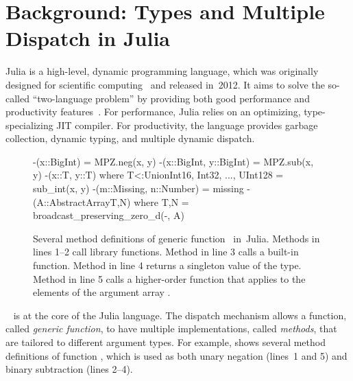 \chapter{Background: Types and Multiple Dispatch in Julia}%
\label{chap:background}


Julia is a high-level, dynamic programming language, which was originally
designed for scientific computing~\cite{bib:bezanson:julia-fresh:2017}
and released in~2012.
It aims to solve the so-called ``two-language problem''
by providing both good performance and productivity
features~\cite{bib:bezanson:julia-dyn-perf:oopsla:2018}.
For performance, Julia relies on an optimizing, type-specializing JIT compiler.
For productivity, the language provides garbage collection, dynamic typing, and
multiple dynamic dispatch.

\begin{figure}[t]
\begin{julia}
-(x::BigInt) = MPZ.neg(x, y)
-(x::BigInt, y::BigInt) = MPZ.sub(x, y)
-(x::T, y::T) where T<:Union{Int16, Int32, ..., UInt128} = sub_int(x, y)
-(m::Missing, n::Number) = missing
-(A::AbstractArray{T,N}) where {T,N} = broadcast_preserving_zero_d(-, A)
\end{julia}
\caption{Several method definitions of generic function~\cjl{(-)} in~Julia.
Methods in lines 1--2 call library functions.
Method in line 3 calls a built-in function.
Method in line 4 returns a singleton value  of the  type.
Method in line 5 calls a higher-order function that applies \cjl{(-)} to the
elements of the argument array .}%
\label{fig:code:subtraction}
\end{figure}

~\cite{bib:bobrow:common-loops:1986,%
bib:chambers:multi-cecil:1992} is at the core of the Julia language.
The dispatch mechanism allows a function, called \emph{generic
function}, to have multiple implementations, called \emph{methods}, that are
tailored to different argument types. For example, 
shows several method definitions of function \cjl{(-)},
which is used as both unary negation (lines~1 and 5)
and binary subtraction (lines 2--4).

